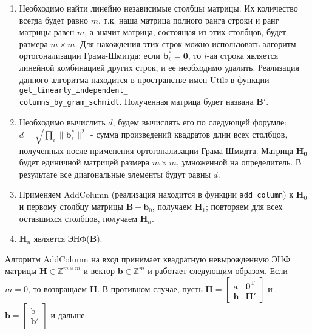 \begin{enumerate}
\item Необходимо найти линейно независимые столбцы матрицы. Их количество всегда будет равно $ m $, т.к. наша матрица полного ранга строки и ранг матрицы равен $ m $, а значит матрица, состоящая из этих столбцов, будет размера $ m \times m $. Для нахождения этих строк можно использовать алгоритм ортогонализации Грама-Шмитда: если $ \mathbf{b}_i^*=\mathbf{0} $, то $ i $-ая строка является линейной комбинацией других строк, и ее необходимо удалить. Реализация данного алгоритма находится в пространстве имен Utils в функции \verb! get_linearly_independent_!\\ \verb!columns_by_gram_schmidt!. Полученная матрица будет названа $  \mathbf{B}' $.
\item Необходимо вычислить $ d $, будем вычислять его по следующей форумле: $ d=\sqrt{\prod_i{\|\mathbf{b}_i^\ast\|^2}} $ - сумма произведений квадратов длин всех столбцов, полученных после применения ортогонализации Грама-Шмидта. Матрица $ \mathbf{H}_\mathbf{0} $ будет единичной матрицей размера $ m \times m $, умноженной на определитель. В результате все диагональные элементы будут равны $ d $.
\item Применяем AddColumn (реализация находится в функции \verb!add_column!) к $ \mathbf{H}_0 $ и первому столбцу матрицы $ \mathbf{B} - \mathbf{b}_0 $, получаем $ \mathbf{H}_1 $; повторяем для всех оставшихся столбцов, получаем $ \mathbf{H}_n $.
\item $ \mathbf{H}_n $ является ЭНФ($ \mathbf{B} $).
\end{enumerate}

Алгоритм AddColumn на вход принимает квадратную невырожденную ЭНФ матрицы $ \mathbf{H} \in \mathbb{Z}^{m \times m} $ и вектор $ \mathbf{b} \in \mathbb{Z}^m $ и работает следующим образом. Если $ m = 0 $, то возвращаем $ \mathbf{H} $. В противном случае, пусть 
$ \mathbf{H} = \left[ \begin{array}{cccc}
\mathrm{a} & \mathbf{0}^\mathrm{T} \\
\mathbf{h} & \mathbf{H}' \end{array} \right] $ и 
$ \mathbf{b} = \left[ \begin{array}{cccc}
\mathrm{b} \\
\mathbf{b}' \end{array} \right] $ и дальше:

